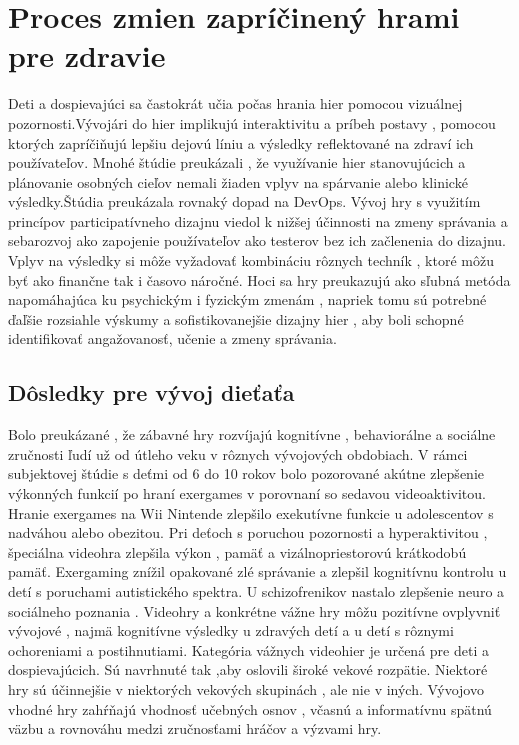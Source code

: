 \documentclass[10pt,oneside,slovak,a4paper]{article}
\begin{document}
\section{Proces zmien zapríčinený hrami pre zdravie}
Deti a dospievajúci sa častokrát učia počas hrania hier pomocou vizuálnej pozornosti.Vývojári do hier implikujú interaktivitu a príbeh postavy , pomocou ktorých zapríčiňujú lepšiu dejovú líniu a výsledky reflektované na zdraví ich používateľov. Mnohé štúdie preukázali , že využívanie hier stanovujúcich a plánovanie osobných cieľov nemali žiaden vplyv na spárvanie alebo klinické výsledky.Štúdia preukázala rovnaký dopad na DevOps. Vývoj hry s využitím princípov participatívneho dizajnu viedol k nižšej účinnosti na zmeny správania a sebarozvoj ako zapojenie používateľov ako testerov bez ich začlenenia do dizajnu. Vplyv na výsledky si môže vyžadovať kombináciu rôznych techník , ktoré môžu byť ako finančne tak i časovo náročné. Hoci sa hry preukazujú ako sľubná metóda napomáhajúca ku psychickým i fyzickým zmenám , napriek tomu sú potrebné ďaľšie rozsiahle výskumy a sofistikovanejšie dizajny hier , aby boli schopné identifikovať angažovanosť, učenie a zmeny správania. 
\subsection{Dôsledky pre vývoj dieťaťa}
Bolo preukázané , že zábavné hry rozvíjajú kognitívne , behaviorálne a sociálne zručnosti ľudí už od útleho veku v rôznych vývojových obdobiach. V rámci subjektovej štúdie s deťmi od 6 do 10 rokov bolo pozorované akútne zlepšenie výkonných funkcií po hraní exergames v porovnaní so sedavou videoaktivitou. Hranie exergames na Wii Nintende zlepšilo exekutívne funkcie u adolescentov s nadváhou alebo obezitou. Pri deťoch s poruchou pozornosti a hyperaktivitou , špeciálna videohra zlepšila výkon , pamäť a vizálnopriestorovú krátkodobú pamäť. Exergaming znížil opakované zlé správanie a zlepšil kognitívnu kontrolu u detí s poruchami autistického spektra. U schizofrenikov nastalo zlepšenie neuro a sociálneho poznania . Videohry a konkrétne vážne hry môžu pozitívne ovplyvniť vývojové , najmä kognitívne výsledky u zdravých detí a u detí s rôznymi ochoreniami a postihnutiami. Kategória vážnych videohier je určená pre deti a dospievajúcich. Sú navrhnuté tak ,aby oslovili široké vekové rozpätie. Niektoré hry sú účinnejšie v niektorých vekových skupinách , ale nie v iných. Vývojovo vhodné hry zahŕňajú vhodnosť učebných osnov , včasnú a informatívnu spätnú väzbu a rovnováhu medzi zručnosťami hráčov a výzvami hry.
\end{document}

